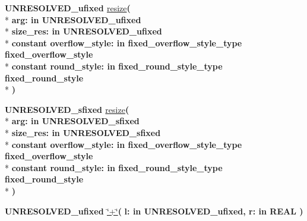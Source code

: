 \begin{DoxyCompactItemize}
{\bfseries {\bfseries \textcolor{vhdlchar}{U\+N\+R\+E\+S\+O\+L\+V\+E\+D\+\_\+ufixed}\textcolor{vhdlchar}{ }}} \hyperlink{class__fixed__pkg_af034c1c5f4d397445d06a2b331870d7f}{resize}{\bfseries  ( }\\*
{\bfseries \textcolor{vhdlchar}{arg\+: }\textcolor{stringliteral}{in }\textcolor{vhdlchar}{U\+N\+R\+E\+S\+O\+L\+V\+E\+D\+\_\+ufixed}}\\*
{\bfseries \textcolor{vhdlchar}{size\+\_\+res\+: }\textcolor{stringliteral}{in }\textcolor{vhdlchar}{U\+N\+R\+E\+S\+O\+L\+V\+E\+D\+\_\+ufixed}}\\*
{\bfseries {\bfseries \textcolor{keywordflow}{constant}\textcolor{vhdlchar}{ }}\textcolor{vhdlchar}{overflow\+\_\+style\+: }\textcolor{stringliteral}{in }\textcolor{vhdlchar}{fixed\+\_\+overflow\+\_\+style\+\_\+type     fixed\+\_\+overflow\+\_\+style}}\\*
{\bfseries {\bfseries \textcolor{keywordflow}{constant}\textcolor{vhdlchar}{ }}\textcolor{vhdlchar}{round\+\_\+style\+: }\textcolor{stringliteral}{in }\textcolor{vhdlchar}{fixed\+\_\+round\+\_\+style\+\_\+type     fixed\+\_\+round\+\_\+style}}\\*
{\bfseries  )} 
\item 
{\bfseries {\bfseries \textcolor{vhdlchar}{U\+N\+R\+E\+S\+O\+L\+V\+E\+D\+\_\+sfixed}\textcolor{vhdlchar}{ }}} \hyperlink{class__fixed__pkg_abf8ab4f861cacff7247feeeeebedcdfb}{resize}{\bfseries  ( }\\*
{\bfseries \textcolor{vhdlchar}{arg\+: }\textcolor{stringliteral}{in }\textcolor{vhdlchar}{U\+N\+R\+E\+S\+O\+L\+V\+E\+D\+\_\+sfixed}}\\*
{\bfseries \textcolor{vhdlchar}{size\+\_\+res\+: }\textcolor{stringliteral}{in }\textcolor{vhdlchar}{U\+N\+R\+E\+S\+O\+L\+V\+E\+D\+\_\+sfixed}}\\*
{\bfseries {\bfseries \textcolor{keywordflow}{constant}\textcolor{vhdlchar}{ }}\textcolor{vhdlchar}{overflow\+\_\+style\+: }\textcolor{stringliteral}{in }\textcolor{vhdlchar}{fixed\+\_\+overflow\+\_\+style\+\_\+type     fixed\+\_\+overflow\+\_\+style}}\\*
{\bfseries {\bfseries \textcolor{keywordflow}{constant}\textcolor{vhdlchar}{ }}\textcolor{vhdlchar}{round\+\_\+style\+: }\textcolor{stringliteral}{in }\textcolor{vhdlchar}{fixed\+\_\+round\+\_\+style\+\_\+type     fixed\+\_\+round\+\_\+style}}\\*
{\bfseries  )} 
\item 
{\bfseries {\bfseries \textcolor{vhdlchar}{U\+N\+R\+E\+S\+O\+L\+V\+E\+D\+\_\+ufixed}\textcolor{vhdlchar}{ }}} \hyperlink{class__fixed__pkg_aa622ccc4cb69ba73b8e7f9a8cfe42788}{\char`\"{}+\char`\"{}}{\bfseries  ( }{\bfseries \textcolor{vhdlchar}{l\+: }\textcolor{stringliteral}{in }\textcolor{vhdlchar}{U\+N\+R\+E\+S\+O\+L\+V\+E\+D\+\_\+ufixed}}{\bfseries  , \textcolor{vhdlchar}{r\+: }\textcolor{stringliteral}{in }{\bfseries \textcolor{comment}{R\+E\+A\+L}\textcolor{vhdlchar}{ }}}{\bfseries  )} 

\end{DoxyCompactItemize}
